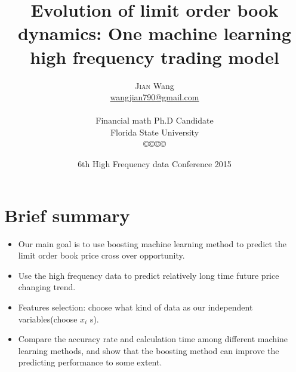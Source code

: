 \documentclass[xcolor={x11names,svgnames,dvipsnames}]{beamer}
\author[\textsc{Jian} Wang]{\textsc{Jian} Wang\\[1ex]%
{\small\url{wangjian790@gmail.com}\\[-.5ex]\url{}}\\
{\small{Financial math Ph.D Candidate}}\\
{\small{Florida State University}}\\
[0.8ex]\copyright\copyright\copyright\copyright} %
\title{Evolution of limit order book dynamics: One machine learning high frequency trading model}
\date[\textsc{HFC} 2015]{6th High Frequency data Conference 2015 }%
\begin{document}
\begin{frame}
\maketitle
\end{frame}



\section{Brief summary}
\begin{frame}
\begin{itemize}
	\item Our main goal is to use boosting machine learning method to predict the limit order book price \alert{cross over} opportunity.  	
	\item Use the high frequency data to predict relatively \alert{long time} future price changing trend.
     \item Features selection: choose what kind of data as our independent variables(\alert{choose $x_i$ s}).  
   	\item Compare the accuracy rate and calculation time  among different machine learning methods, and show that the boosting method can improve the \alert{predicting performance} to some extent.  	
\end{itemize}
\end{frame}
\end{document}
